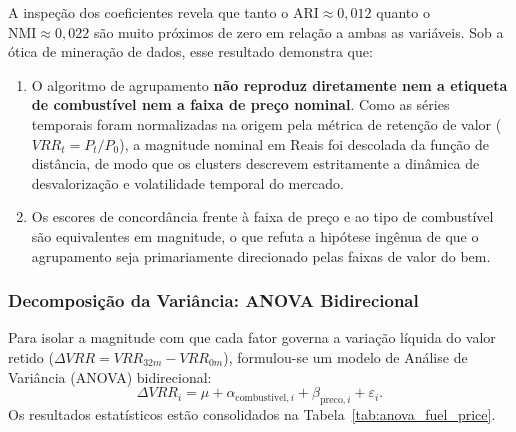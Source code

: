 \begin{table}[htbp]
\centering
\caption{Métricas de validação externa entre os agrupamentos ($K=4$) e as variáveis de controle.}
\label{tab:external_validation}
\small
{}
\end{table}

A inspeção dos coeficientes revela que tanto o $\mathrm{ARI} \approx 0{,}012$ quanto o $\mathrm{NMI} \approx 0{,}022$ são muito próximos de zero em relação a ambas as variáveis. Sob a ótica de mineração de dados, esse resultado demonstra que:
\begin{enumerate}
    \item O algoritmo de agrupamento \textbf{não reproduz diretamente nem a etiqueta de combustível nem a faixa de preço nominal}. Como as séries temporais foram normalizadas na origem pela métrica de retenção de valor ($VRR_t = P_t / P_0$), a magnitude nominal em Reais foi descolada da função de distância, de modo que os clusters descrevem estritamente a dinâmica de desvalorização e volatilidade temporal do mercado.
    \item Os escores de concordância frente à faixa de preço e ao tipo de combustível são equivalentes em magnitude, o que refuta a hipótese ingênua de que o agrupamento seja primariamente direcionado pelas faixas de valor do bem.
\end{enumerate}

\subsubsection{Decomposição da Variância: ANOVA Bidirecional}

Para isolar a magnitude com que cada fator governa a variação líquida do valor retido ($\Delta VRR = VRR_{32m} - VRR_{0m}$), formulou-se um modelo de Análise de Variância (ANOVA) bidirecional:
\begin{equation}
\Delta VRR_{i} = \mu + \alpha_{\text{combustivel}, i} + \beta_{\text{preco}, i} + \varepsilon_i.
\end{equation}
Os resultados estatísticos estão consolidados na Tabela~\ref{tab:anova_fuel_price}.

